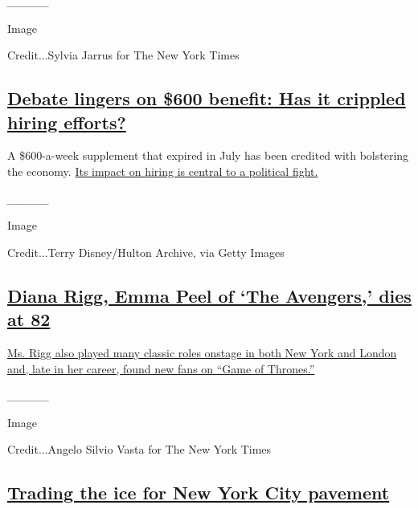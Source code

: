 \emph{\_\_\_\_\_}

Image

Credit...Sylvia Jarrus for The New York Times

\hypertarget{debate-lingers-on-600-benefit-has-it-crippled-hiring-efforts}{%
\subsection{\texorpdfstring{\href{https://www.nytimes3xbfgragh.onion/2020/09/10/business/economy/unemployment-benefits-hiring.html}{Debate
lingers on \$600 benefit: Has it crippled hiring
efforts?}}{Debate lingers on \$600 benefit: Has it crippled hiring efforts?}}\label{debate-lingers-on-600-benefit-has-it-crippled-hiring-efforts}}

A \$600-a-week supplement that expired in July has been credited with
bolstering the economy.
\href{https://www.nytimes3xbfgragh.onion/2020/09/10/business/economy/unemployment-benefits-hiring.html}{Its
impact on hiring is central to a political fight.}

\emph{\_\_\_\_\_}

Image

Credit...Terry Disney/Hulton Archive, via Getty Images

\hypertarget{diana-rigg-emma-peel-of-the-avengers-dies-at-82}{%
\subsection{\texorpdfstring{\href{https://www.nytimes3xbfgragh.onion/2020/09/10/obituaries/diana-rigg-dead.html}{Diana
Rigg, Emma Peel of `The Avengers,' dies at
82}}{Diana Rigg, Emma Peel of `The Avengers,' dies at 82}}\label{diana-rigg-emma-peel-of-the-avengers-dies-at-82}}

\href{https://www.nytimes3xbfgragh.onion/2020/09/10/obituaries/diana-rigg-dead.html}{Ms.
Rigg also played many classic roles onstage in both New York and London
and, late in her career, found new fans on ``Game of Thrones.''}

\emph{\_\_\_\_\_}

Image

Credit...Angelo Silvio Vasta for The New York Times

\hypertarget{trading-the-ice-for-new-york-city-pavement}{%
\subsection{\texorpdfstring{\href{https://www.nytimes3xbfgragh.onion/2020/09/10/arts/dance/ice-theater-of-new-york-on-pavement.html}{Trading
the ice for New York City
pavement}}{Trading the ice for New York City pavement}}\label{trading-the-ice-for-new-york-city-pavement}}

